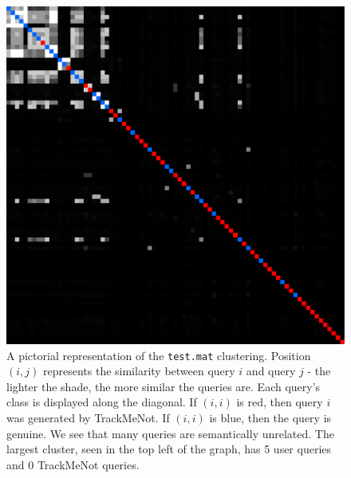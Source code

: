 \documentclass[11pt]{article}
\begin{document}
\begin{multicols}{2}
  \begin{figure}[h]
    \centering
    \includegraphics[width=\linewidth]{test}
    \caption{A pictorial representation of the \texttt{test.mat}
      clustering. Position $(i,j)$ represents the similarity between
      query $i$ and query $j$ - the lighter the shade, the more
      similar the queries are. Each query's class is displayed along
      the diagonal. If $(i,i)$ is red, then query $i$ was generated by
      TrackMeNot. If $(i,i)$ is blue, then the query is genuine. We
      see that many queries are semantically unrelated. The largest
      cluster, seen in the top left of the graph, has 5 user queries and 0
      TrackMeNot queries.}
    \label{fig:disco.test}
  \end{figure}



\end{multicols}
\end{document}
